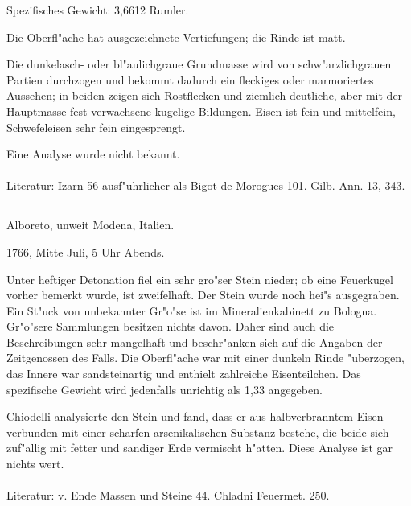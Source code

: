 \documentclass[a4paper, 11pt, oneside]{article}
\begin{document}
Spezifisches Gewicht: 3,6612 Rumler.

Die Oberfl"ache hat ausgezeichnete Vertiefungen; die Rinde ist matt.

Die dunkelasch- oder bl"aulichgraue Grundmasse wird von schw"arzlichgrauen Partien durchzogen und bekommt dadurch ein fleckiges oder marmoriertes Aussehen; in beiden zeigen sich Rostflecken und ziemlich deutliche, aber mit der Hauptmasse fest verwachsene kugelige Bildungen. Eisen ist fein und mittelfein, Schwefeleisen sehr fein eingesprengt.

Eine Analyse wurde nicht bekannt.
\normalsize
\paragraph{}
Literatur: Izarn 56 ausf"uhrlicher als Bigot de Morogues 101. Gilb. Ann. 13, 343.
\subsection{}
\LARGE
\paragraph{}
Alboreto, unweit Modena, Italien.

1766, Mitte Juli, 5 Uhr Abends.

Unter heftiger Detonation fiel ein sehr gro"ser Stein nieder; ob eine Feuerkugel vorher bemerkt wurde, ist zweifelhaft. Der Stein wurde noch hei"s ausgegraben. Ein St"uck von unbekannter Gr"o"se ist im Mineralienkabinett zu Bologna. Gr"o"sere Sammlungen besitzen nichts davon. Daher sind auch die Beschreibungen sehr mangelhaft und beschr"anken sich auf die Angaben der Zeitgenossen des Falls. Die Oberfl"ache war mit einer dunkeln Rinde "uberzogen, das Innere war sandsteinartig und enthielt zahlreiche Eisenteilchen. Das spezifische Gewicht wird jedenfalls unrichtig als 1,33 angegeben.

Chiodelli analysierte den Stein und fand, dass er aus halbverbranntem Eisen verbunden mit einer scharfen arsenikalischen Substanz bestehe, die beide sich zuf"allig mit fetter und sandiger Erde vermischt h"atten. Diese Analyse ist gar nichts wert.
\normalsize
\paragraph{}
Literatur: v. Ende Massen und Steine 44. Chladni Feuermet. 250.
\subsection{}
\LARGE
\end{document}
